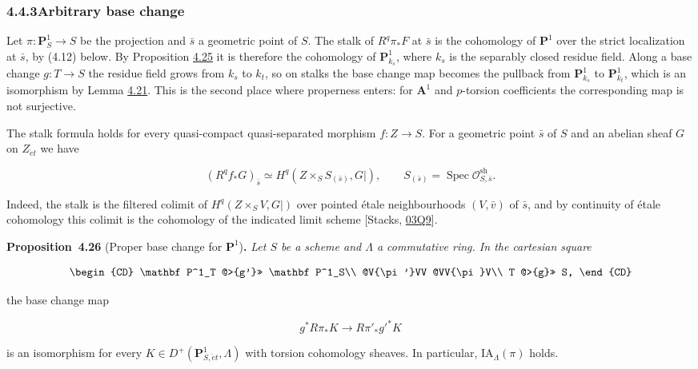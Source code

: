 \documentclass[11pt]{article}
\newenvironment{bpstatement}[2]{\par\addvspace{0.6\baselineskip}\noindent\textbf{#1}#2\textbf{.}\enspace\ignorespaces}
  {\par\addvspace{0.4\baselineskip}}
\newenvironment{bpstatementit}[2]{\begin{bpstatement}{#1}{#2}\itshape\ignorespaces}{\end{bpstatement}}
\begin{document}
\subsubsection*{\texorpdfstring{4.4.3\quad Arbitrary base change}{4.4.3 Arbitrary base change}}
\label{bp358}%
\label{bp359}%
Let \(\pi:\mathbf P^1_S\to S\) be the projection and \(\bar s\) a geometric point of \(S\). The stalk of \(R^q\pi_*F\) at \(\bar s\) is the cohomology of \(\mathbf P^1\) over the strict localization at \(\bar s\), by (4.12) below. By Proposition \hyperref[bp355]{4.25} it is therefore the cohomology of \(\mathbf P^1_{k_s}\), where \(k_s\) is the separably closed residue field. Along a base change \(g:T\to S\) the residue field grows from \(k_s\) to \(k_t\), so on stalks the base change map becomes the pullback from \(\mathbf P^1_{k_s}\) to \(\mathbf P^1_{k_t}\), which is an isomorphism by Lemma \hyperref[bp344]{4.21}. This is the second place where properness enters: for \(\mathbf A^1\) and \(p\)-torsion coefficients the corresponding map is not surjective.

The stalk formula holds for every quasi-compact quasi-separated morphism \(f:Z\to S\). For a geometric point \(\bar s\) of \(S\) and an abelian sheaf \(G\) on \(Z_{\acute{e}t}\) we have

\[
(R^qf_*G)_{\bar s}
\simeq H^q(Z\times_SS_{(\bar s)},G|),\qquad
S_{(\bar s)}=\operatorname{Spec}\mathcal O^{\mathrm{sh}}_{S,\bar s}.
\tag{4.12}
\]

Indeed, the stalk is the filtered colimit of \(H^q(Z\times_SV,G|)\) over pointed étale neighbourhoods \((V,\bar v)\) of \(\bar s\), and by continuity of étale cohomology this colimit is the cohomology of the indicated limit scheme [Stacks, \href{https://stacks.math.columbia.edu/tag/03Q9}{03Q9}].

\label{bp360}%
\begin{bpstatementit}{Proposition~4.26}{ (Proper base change for $\mathbf P^1$)}
Let \(S\) be a scheme and \(\Lambda\) a commutative ring.  In the cartesian square

\[
\begin{CD}
\mathbf P^1_T @>{g'}>> \mathbf P^1_S\\
@V{\pi'}VV @VV{\pi}V\\
T @>{g}>> S,
\end{CD}
\]

the base change map

\[
g^*R\pi_*K\longrightarrow R\pi'_*g'^*K
\]

is an isomorphism for every \(K\in D^+(\mathbf P^1_{S,\acute{e}t},\Lambda)\) with torsion cohomology sheaves. In particular, \(\mathrm{IA}_\Lambda(\pi)\) holds.
\end{bpstatementit}
\end{document}
